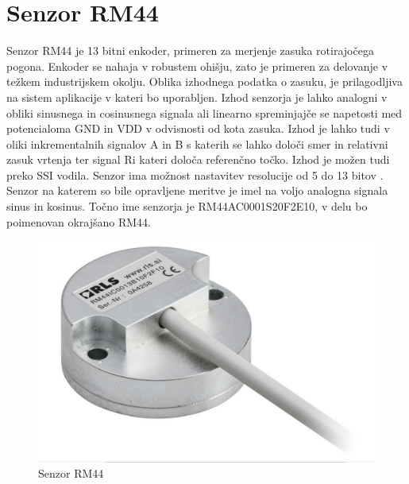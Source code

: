 






\chapter{Senzor RM44}

Senzor RM44 je 13 bitni enkoder, primeren za merjenje zasuka rotirajočega pogona\cite{RM44}.
Enkoder se nahaja v robustem ohišju, zato je primeren za delovanje v težkem industrijskem okolju. %
Oblika izhodnega podatka o zasuku, je prilagodljiva na sistem aplikacije v kateri bo uporabljen\cite{Ambrozic}. Izhod senzorja je lahko analogni v obliki sinusnega in cosinusnega signala ali linearno spreminjajče se napetosti med potencialoma GND in VDD v odvisnosti od kota zasuka.
Izhod je lahko tudi v oliki inkrementalnih signalov A in B s katerih se lahko določi smer in relativni zasuk vrtenja ter signal Ri kateri določa referenčno točko. Izhod je možen tudi preko SSI vodila. Senzor ima možnost nastavitev resolucije od 5 do 13 bitov \cite{AM8192}\cite{RM44}. Senzor na katerem so bile opravljene meritve je imel na voljo analogna signala sinus in kosinus. Točno ime senzorja je RM44AC0001S20F2E10, v delu bo poimenovan okrajšano RM44.
\begin{figure}[h]
	\centering
	\includegraphics[width=0.6\columnwidth]{./Slike/senzorRM44.jpg}
	\caption{Senzor RM44}
	\label{RM44}
\end{figure}

